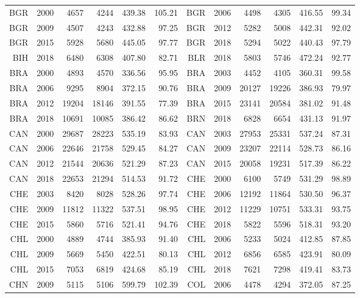 {\begin{longtable}{r|r|r|r|r|r||r|r|r|r|r|r}
    BGR   & 2000  & 4657  & 4244  & 439.38 & 105.21 & BGR   & 2006  & 4498  & 4305  & 416.55 & 99.34 \\
    BGR   & 2009  & 4507  & 4243  & 432.88 & 97.25 & BGR   & 2012  & 5282  & 5008  & 442.31 & 92.02 \\
    BGR   & 2015  & 5928  & 5680  & 445.05 & 97.77 & BGR   & 2018  & 5294  & 5022  & 440.43 & 97.79 \\
    BIH   & 2018  & 6480  & 6308  & 407.80 & 82.71 & BLR   & 2018  & 5803  & 5746  & 472.24 & 92.77 \\
    BRA   & 2000  & 4893  & 4570  & 336.56 & 95.95 & BRA   & 2003  & 4452  & 4105  & 360.31 & 99.58 \\
    BRA   & 2006  & 9295  & 8904  & 372.15 & 90.76 & BRA   & 2009  & 20127 & 19226 & 386.93 & 79.97 \\
    BRA   & 2012  & 19204 & 18146 & 391.55 & 77.39 & BRA   & 2015  & 23141 & 20584 & 381.02 & 91.48 \\
    BRA   & 2018  & 10691 & 10085 & 386.42 & 86.62 & BRN   & 2018  & 6828  & 6654  & 431.13 & 91.97 \\
    CAN   & 2000  & 29687 & 28223 & 535.19 & 83.93 & CAN   & 2003  & 27953 & 25331 & 537.24 & 87.31 \\
    CAN   & 2006  & 22646 & 21758 & 529.45 & 84.27 & CAN   & 2009  & 23207 & 22114 & 528.73 & 86.16 \\
    CAN   & 2012  & 21544 & 20636 & 521.29 & 87.23 & CAN   & 2015  & 20058 & 19231 & 517.39 & 86.22 \\
    CAN   & 2018  & 22653 & 21294 & 514.53 & 91.72 & CHE   & 2000  & 6100  & 5749  & 531.29 & 98.89 \\
    CHE   & 2003  & 8420  & 8028  & 528.26 & 97.74 & CHE   & 2006  & 12192 & 11864 & 530.50 & 96.37 \\
    CHE   & 2009  & 11812 & 11322 & 537.51 & 98.95 & CHE   & 2012  & 11229 & 10751 & 533.31 & 93.75 \\
    CHE   & 2015  & 5860  & 5716  & 521.41 & 94.76 & CHE   & 2018  & 5822  & 5596  & 518.31 & 93.20 \\
    CHL   & 2000  & 4889  & 4744  & 385.93 & 91.40 & CHL   & 2006  & 5233  & 5024  & 412.85 & 87.85 \\
    CHL   & 2009  & 5669  & 5450  & 422.51 & 80.13 & CHL   & 2012  & 6856  & 6585  & 423.91 & 80.09 \\
    CHL   & 2015  & 7053  & 6819  & 424.68 & 85.19 & CHL   & 2018  & 7621  & 7298  & 419.41 & 83.73 \\
    CHN   & 2009  & 5115  & 5106  & 599.79 & 102.39 & COL   & 2006  & 4478  & 4294  & 372.05 & 87.25 \\

\end{longtable}}

